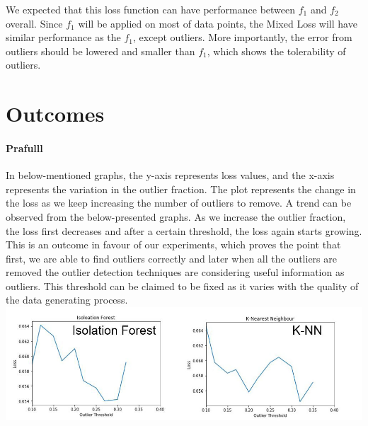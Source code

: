 \documentclass[runningheads]{llncs}
\begin{document}
We expected that this loss function can have performance between $f_1$ and $f_2$ overall. Since $f_1$ will be applied on most of data points, the Mixed Loss will have similar performance as the $f_1$, except outliers. More importantly, the error from outliers should be lowered and smaller than $f_1$, which shows the tolerability of outliers.


\section{Outcomes}
\paragraph{Prafulll} In below-mentioned graphs, the y-axis represents loss values, and the x-axis represents the variation in the outlier fraction. The plot represents the change in the loss as we keep increasing the number of outliers to remove. A trend can be observed from the below-presented graphs.  As we increase the outlier fraction, the loss first decreases and after a certain threshold, the loss again starts growing. This is an outcome in favour of our experiments, which proves the point that first, we are able to find outliers correctly and later when all the outliers are removed the outlier detection techniques are considering useful information as outliers. This threshold can be claimed to be fixed as it varies with the quality of the data generating process. \\
\includegraphics[scale=0.37]{tt2.jpg}
\end{document}
